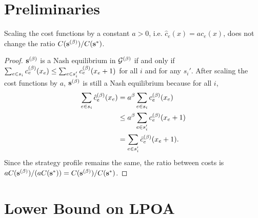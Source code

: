 \documentclass[twoside]{article}
\begin{document}
\begin{multicols}{2}
\section{Preliminaries}
\begin{lem} \label{lem:scale}
  Scaling the cost functions by a constant $a > 0$, i.e. $\hat c_e(x) = a
  c_e(x)$, does not change the ratio $C(\mathbf{s}^{(\beta)})/C(\mathbf{s}^*)$.
\end{lem}
\begin{proof}
  $\mathbf{s}^{(\beta)}$ is a Nash equilibrium in $\mathcal{G}^{(\beta)}$ if and only if $\sum_{e
  \in s_i} c_e^{(\beta)}(x_e) \le \sum_{e \in s_i'} c_e^{(\beta)}(x_e + 1)$ for all $i$
  and for any $s_i'$. After scaling the cost functions by $a$, $\mathbf{s}^{(\beta)}$ is
  still a Nash equilibrium because for all $i$,
  \begin{align*}
    \sum_{e \in s_i} \hat c_e^{(\beta)}(x_e) &= a^\beta \sum_{e \in s_i}
    c_e^{(\beta)}(x_e) \\
    &\le a^\beta \sum_{e \in s_i'} c_e^{(\beta)}(x_e + 1) \\
    &= \sum_{e \in s_i'} \hat c_e^{(\beta)}(x_e+1).
  \end{align*}
  Since the strategy profile remains the same, the ratio between costs is $a
  C(\mathbf{s}^{(\beta)})/(a C(\mathbf{s}^*)) = C(\mathbf{s}^{(\beta)})/C(\mathbf{s}^*)$.
\end{proof}
\section{Lower Bound on LPOA} \label{sec:lb}
\begin{figure}[H]
  \centering
  \begin{subfigure}[b]{\linewidth}
    \centering
\end{subfigure}
\end{figure}
\end{multicols}
\end{document}
